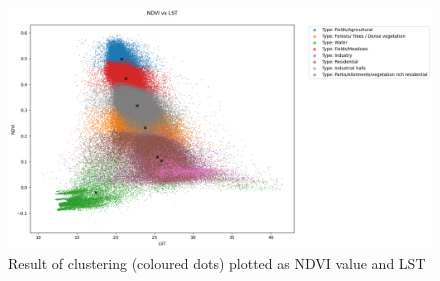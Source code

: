 \documentclass[12pt,a4paper, english]{article}
\begin{document}
        \begin{figure}[!htbp]
          \centering
          \includegraphics[width=\textwidth]{img/NDVI vs LST.png}
          \caption{Result of clustering (coloured dots) plotted as \gls{NDVI} value and \gls{LST}\label{fig:kmeansclusters}}
        \end{figure}
\end{document}
